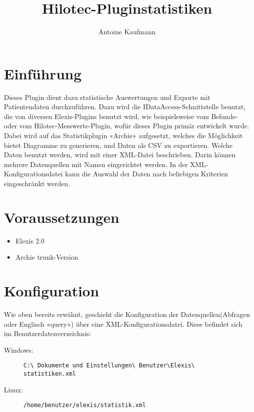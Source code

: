 \documentclass[a4paper]{scrartcl}
\title{Hilotec-Pluginstatistiken}
\author{Antoine Kaufmann}
\begin{document}
\maketitle
\section{Einführung}
Dieses Plugin dient dazu statistische Auswertungen und Exporte mit
Patientendaten durchzuführen. Dazu wird die IDataAccess-Schnittstelle benutzt,
die von diversen Elexis-Plugins benutzt wird, wie beispielsweise vom
Befunde- oder vom Hilotec-Messwerte-Plugin, wofür dieses Plugin primär
entwickelt wurde. Dabei wird auf das Statistikplugin «Archie» aufgesetzt,
welches die Möglichkeit bietet Diagramme zu generieren, und Daten als CSV zu
exportieren. Welche Daten benutzt werden, wird mit einer XML-Datei beschrieben.
Darin können mehrere Datenquellen mit Namen eingerichtet werden. In der
XML-Konfigurationsdatei kann die Auswahl der Daten nach beliebigen Kriterien
eingeschränkt werden.

\section{Voraussetzungen}
\begin{itemize}
    \item Elexis 2.0
    \item Archie trunk-Version
\end{itemize}

\section{Konfiguration}
Wie oben bereits erwähnt, geschieht die Konfiguration der Datenquellen(Abfragen
oder Englisch «query») über eine XML-Konfigurationsdatei. Diese befindet sich im
Be\-nutz\-er\-da\-ten\-ver\-zei\-chnis:
\begin{description}
    \item[Windows:] \texttt{C:\textbackslash
                                Dokumente und Einstellungen\textbackslash
                                Benutzer\textbackslash Elexis\textbackslash
                                statistiken.xml}
    \item[Linux:] \texttt{/home/benutzer/elexis/statistik.xml}
\end{description}
\end{document}
